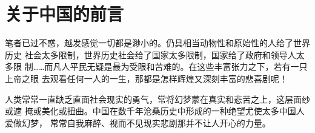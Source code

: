 \chapter{关于中国的前言}







笔者已过不惑，越发感觉一切都是渺小的。仍具相当动物性和原始性的人给了世界历史
社会太多限制，世界历史社会给了国家太多限制，国家给了政府和领导人太多限
制……而凡人平民无疑是最为受限和苦难的。在这些丰富张力之下，若有一只上帝之眼
去观看任何一人的一生，那都是怎样辉煌又深刻丰富的悲喜剧呢！


人类常常一直缺乏直面社会现实的勇气，常将幻梦蒙在真实和悲苦之上，这层面纱或遮
掩或美化或扭曲。中国在数千年沧桑历史中形成的一种绝望尤使太多中国人爱做幻梦，
常常自我麻醉、视而不见现实悲剧那并不让人开心的力量。

